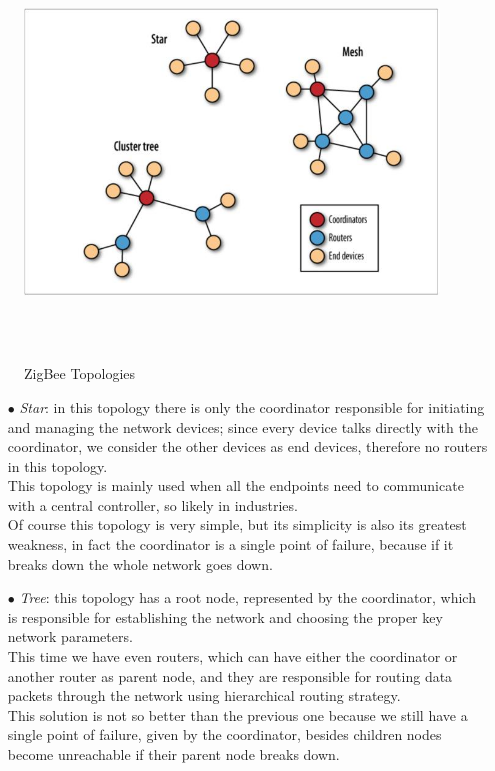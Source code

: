 \documentclass[12pt]{report}
\begin{document}
{{\begin{figure}[H]
\includegraphics[width=11cm,height=11cm,keepaspectratio]{zigbee_topologies}
\centering
\caption{ZigBee Topologies}
\end{figure}

\begin{itemize}
\setlength{\itemindent}{+4mm}
\item[$\bullet$] \emph{Star}: in this topology there is only the coordinator responsible for initiating and managing the network devices; since every device talks directly with the coordinator, we consider the other devices as end devices, therefore no routers in this topology.\\
This topology is mainly used when all the endpoints need to communicate with a central controller, so likely in industries.\\
Of course this topology is very simple, but its simplicity is also its greatest weakness, in fact the coordinator is a single point of failure, because if it breaks down the whole network goes down.

\item[$\bullet$] \emph{Tree}: this topology has a root node, represented by the coordinator, which is responsible for establishing the network and choosing the proper key network parameters.\\
This time we have even routers, which can have either the coordinator or another router as parent node, and they are responsible for routing data packets through the network using hierarchical routing strategy.\\
This solution is not so better than the previous one because we still have a single point of failure, given by the coordinator, besides children nodes become unreachable if their parent node breaks down.


\end{itemize}}}
\end{document}
